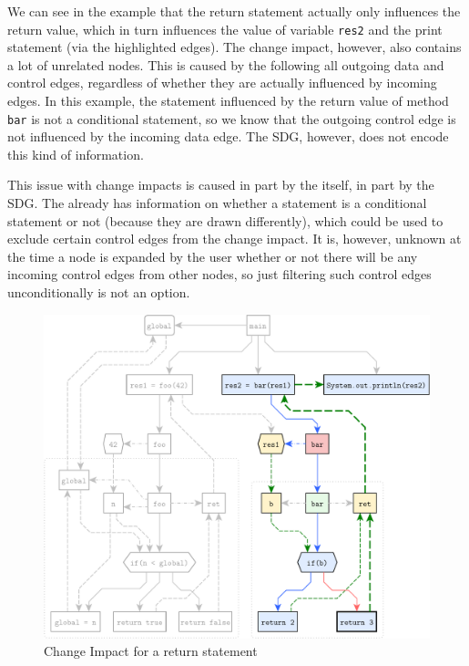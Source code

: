 We can see in the example that the return statement actually only influences the return value, which in turn influences 
the value of variable \lstinline|res2| and the print statement (via the highlighted edges). The change impact, however, 
also contains a lot of unrelated nodes. This is caused by the \SB following all outgoing data and control edges, 
regardless of whether they are actually influenced by incoming edges. In this example, the statement influenced by the 
return value of method \lstinline|bar| is not a conditional statement, so we know that the outgoing control edge is not 
influenced by the incoming data edge. The SDG, however, does not encode this kind of information.

This issue with change impacts is caused in part by the \SB itself, in part by the SDG. The \SB already has information 
on whether a statement is a conditional statement or not (because they are drawn differently), which could be used to 
exclude certain control edges from the change impact. It is, however, unknown at the time a node is expanded by the 
user whether or not there will be any incoming control edges from other nodes, so just filtering such control edges 
unconditionally is not an option.

\begin{figure}[htbp]
  \centering
    \includegraphics[scale=0.6]{sdgs/changeimpact}
  \caption{Change Impact for a return statement}
  \label{fig:sdg-changeimpact}
\end{figure}

